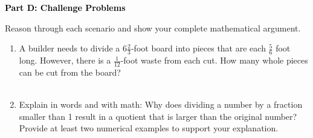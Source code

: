 \documentclass[12pt, letterpaper, fleqn]{article}
\begin{document}
\begin{tcolorbox}[colback=black!10]
    \large\textcolor{black}{\textbf{Part D: Challenge Problems}}
\end{tcolorbox}

\vspace{3mm}
\noindent
Reason through each scenario and show your complete mathematical argument.

\vspace{5mm}
\begin{enumerate}[itemsep=2.5cm, leftmargin=0.6cm]
\item A builder needs to divide a $6\frac{2}{3}$-foot board into pieces that are each $\frac{5}{6}$ foot long. However, there is a $\frac{1}{12}$-foot waste from each cut. How many whole pieces can be cut from the board? \\ \\
\vspace{2cm}
\item Explain in words and with math: Why does dividing a number by a fraction smaller than 1 result in a quotient that is larger than the original number? Provide at least two numerical examples to support your explanation. \\ \\
\vspace{2cm}
\end{enumerate}
\end{document}
